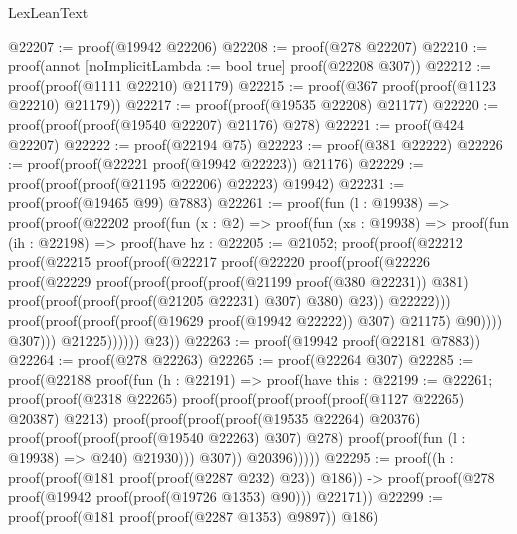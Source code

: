 \begin{lexlean}{LexLeanText}
\begin{coremodule}
@22207 := proof(@19942 @22206)
@22208 := proof(@278 @22207)
@22210 := proof(annot [noImplicitLambda := bool true] proof(@22208 @307))
@22212 := proof(proof(@1111 @22210) @21179)
@22215 := proof(@367 proof(proof(@1123 @22210) @21179))
@22217 := proof(proof(@19535 @22208) @21177)
@22220 := proof(proof(proof(@19540 @22207) @21176) @278)
@22221 := proof(@424 @22207)
@22222 := proof(@22194 @75)
@22223 := proof(@381 @22222)
@22226 := proof(proof(@22221 proof(@19942 @22223)) @21176)
@22229 := proof(proof(proof(@21195 @22206) @22223) @19942)
@22231 := proof(proof(@19465 @99) @7883)
@22261 := proof(fun (l : @19938) =>
    proof(proof(@22202
          proof(fun (x : @2) =>
            proof(fun (xs : @19938) =>
              proof(fun (ih : @22198) =>
                proof(have hz : @22205 := @21052;
                  proof(proof(@22212
                        proof(@22215
                            proof(proof(@22217
                                  proof(@22220
                                      proof(proof(@22226
                                            proof(@22229
                                                proof(proof(proof(proof(@21199 proof(@380 @22231))
                                                        @381)
                                                      proof(proof(proof(proof(@21205 @22231) @307)
                                                            @380)
                                                          @23))
                                                    @22222)))
                                          proof(proof(proof(proof(@19629 proof(@19942 @22222)) @307)
                                                @21175)
                                              @90))))
                                @307)))
                      @21225))))))
        @23))
@22263 := proof(@19942 proof(@22181 @7883))
@22264 := proof(@278 @22263)
@22265 := proof(@22264 @307)
@22285 := proof(@22188
      proof(fun (h : @22191) =>
        proof(have this : @22199 := @22261;
          proof(proof(@2318 @22265)
              proof(proof(proof(proof(proof(@1127 @22265) @20387) @2213)
                    proof(proof(proof(proof(@19535 @22264) @20376)
                          proof(proof(proof(proof(@19540 @22263) @307) @278)
                              proof(proof(fun (l : @19938) => @240) @21930)))
                        @307))
                  @20396)))))
@22295 := proof((h : proof(proof(@181 proof(proof(@2287 @232) @23)) @186)) ->
    proof(proof(@278 proof(@19942 proof(proof(@19726 @1353) @90))) @22171))
@22299 := proof(proof(@181 proof(proof(@2287 @1353) @9897)) @186)

\end{coremodule}
\end{lexlean}
